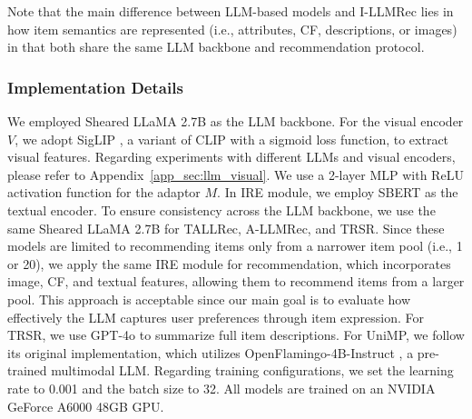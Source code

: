 \documentclass[sigconf]{acmart}
\newcommand{\proposed}{\textsf{I-LLMRec}}
\begin{document}
{Note that the main difference between LLM-based models and \proposed{} lies in how item semantics are represented (i.e., attributes, CF, descriptions, or images) in that both share the same LLM backbone and recommendation protocol.}




\subsubsection{\textbf{Implementation Details}}
\label{sec:implementation}
We employed Sheared LLaMA 2.7B \cite{xia2023sheared} as the LLM backbone. For the visual encoder $V$, we adopt SigLIP \cite{zhai2023sigmoid}, a variant of CLIP \cite{radford2021learning} with a sigmoid loss function, to extract visual features. Regarding experiments with different LLMs and visual encoders, please refer to Appendix~\ref{app_sec:llm_visual}. We use a 2-layer MLP with ReLU activation function for the adaptor $M$. In IRE module, we employ SBERT \cite{reimers2019sentence} as the textual encoder. To ensure consistency across the LLM backbone, we use the same Sheared LLaMA 2.7B for TALLRec, A-LLMRec, and TRSR. Since these models are limited to recommending items only from a narrower item pool (i.e., 1 or 20), we apply the same IRE module for recommendation, which incorporates image, CF, and textual features, allowing them to recommend items from a larger pool. This approach is acceptable since our main goal is to evaluate how effectively the LLM captures user preferences through item expression. For TRSR, we use GPT-4o \cite{open2024gpt4o} to summarize full item descriptions. 
For UniMP, we follow its original implementation, which utilizes OpenFlamingo-4B-Instruct \cite{awadalla2023openflamingo}, a pre-trained multimodal LLM. Regarding training configurations, we set the learning rate to 0.001 and the batch size to 32. All models are trained on an NVIDIA GeForce A6000 48GB GPU.







\end{document}
